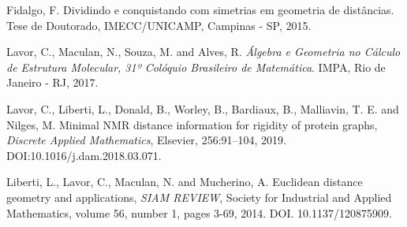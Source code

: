 \documentclass[a4,11pt]{pssbmac}
\begin{document}
	\vspace{-0.14cm}
	\begin{thebibliography}{00}
		
		Fidalgo, F. Dividindo e conquistando com simetrias em geometria de distâncias. Tese de Doutorado, IMECC/UNICAMP, Campinas - SP, 2015.
		
		Lavor, C., Maculan, N., Souza, M. and Alves, R. {\it Álgebra e Geometria no Cálculo de Estrutura Molecular, 31º Colóquio Brasileiro de Matemática}. IMPA, Rio de Janeiro - RJ, 2017.
		
		
		Lavor, C., Liberti, L., Donald, B., Worley, B., Bardiaux, B., Malliavin, T. E. and Nilges, M. Minimal NMR distance information for rigidity of protein graphs, {\it Discrete Applied Mathematics}, Elsevier, 256:91--104, 2019. DOI:10.1016/j.dam.2018.03.071.

		
		Liberti, L., Lavor, C., Maculan, N. and Mucherino, A. Euclidean distance geometry and applications, {\it SIAM REVIEW}, Society for Industrial and Applied Mathematics,  volume 56, number 1, pages 3-69, 2014. DOI. 10.1137/120875909.
		
		
		
		

\end{thebibliography}
\end{document}
